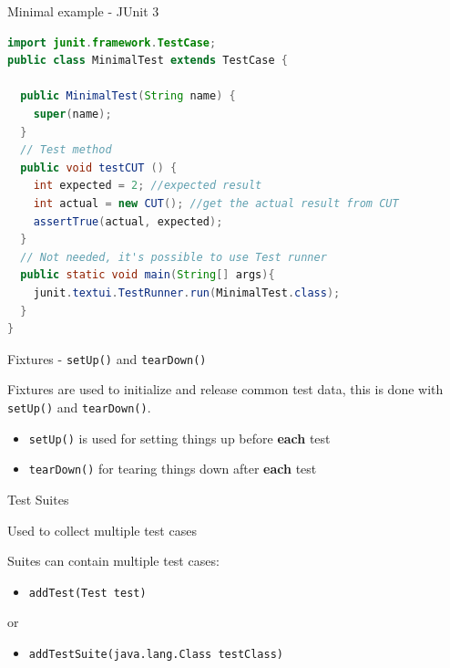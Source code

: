 \documentclass[11pt, xcolor=svgnames]{beamer}
\begin{document}

\begin{frame}[fragile]{Minimal example - JUnit 3}

\begin{center}
\begin{lstlisting}[language=Java,basicstyle=\scriptsize]
import junit.framework.TestCase;
public class MinimalTest extends TestCase {

  public MinimalTest(String name) {
    super(name);
  }
  // Test method
  public void testCUT () {
    int expected = 2; //expected result
    int actual = new CUT(); //get the actual result from CUT
    assertTrue(actual, expected);
  }
  // Not needed, it's possible to use Test runner
  public static void main(String[] args){
    junit.textui.TestRunner.run(MinimalTest.class);
  }
}
\end{lstlisting}
\end{center}

\end{frame}


\begin{frame}{Fixtures - \texttt{setUp()} and \texttt{tearDown()}}

Fixtures are used to initialize and release common test data, this is done with \texttt{setUp()} and \texttt{tearDown()}.


\begin{itemize}
  \item \texttt{setUp()} is used for setting things up before \textbf{each} test
  \item \texttt{tearDown()} for tearing things down after \textbf{each} test
\end{itemize}

\end{frame}




\begin{frame}[fragile]{Test Suites}

Used to collect multiple test cases

Suites can contain multiple test cases: 

\begin{itemize}
 \item \texttt{addTest(Test test)}
\end{itemize}

or

\begin{itemize}
 \item \texttt{addTestSuite(java.lang.Class testClass)}
\end{itemize}


\end{frame}
\end{document}
